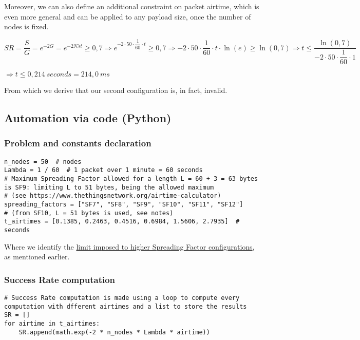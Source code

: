 \documentclass[a4paper,11pt]{article} %
\begin{document}
    \smallskip

    Moreover, we can also define an additional constraint on packet airtime, which is even more general and can be applied to any payload size, once the number of nodes is fixed.

    \smallskip

    $SR = \dfrac{S}{G} = e^{-2G} = e^{-2N\lambda t} \geq 0,7 \Rightarrow e^{-2\cdot 50 \cdot \dfrac{1}{60} \cdot t} \geq 0,7 \Rightarrow -2 \cdot 50 \cdot \dfrac{1}{60} \cdot t \cdot \ln(e) \geq \ln(0,7) \Rightarrow t \leq \dfrac{\ln(0,7)}{-2 \cdot 50 \cdot \dfrac{1}{60} \cdot 1}$

    \smallskip

    $\Rightarrow t \leq 0,214 \ seconds = 214,0\ ms$

    \smallskip

    From which we derive that our second configuration is, in fact, invalid.

    \subsection{Automation via code (Python)}\label{subsec:automation-via-code-(python)}

    \subsubsection{Problem and constants declaration}

    \begin{verbatim}
n_nodes = 50  # nodes
Lambda = 1 / 60  # 1 packet over 1 minute = 60 seconds
# Maximum Spreading Factor allowed for a length L = 60 + 3 = 63 bytes is SF9: limiting L to 51 bytes, being the allowed maximum
# (see https://www.thethingsnetwork.org/airtime-calculator)
spreading_factors = ["SF7", "SF8", "SF9", "SF10", "SF11", "SF12"]
# (from SF10, L = 51 bytes is used, see notes)
t_airtimes = [0.1385, 0.2463, 0.4516, 0.6984, 1.5606, 2.7935]  # seconds
    \end{verbatim}

    Where we identify the \hyperref[limit-sf]{limit imposed to higher Spreading Factor configurations}, as mentioned earlier.

    \subsubsection{Success Rate computation}

    \begin{verbatim}
# Success Rate computation is made using a loop to compute every computation with dfferent airtimes and a list to store the results
SR = []
for airtime in t_airtimes:
    SR.append(math.exp(-2 * n_nodes * Lambda * airtime))
    \end{verbatim}
\end{document}
